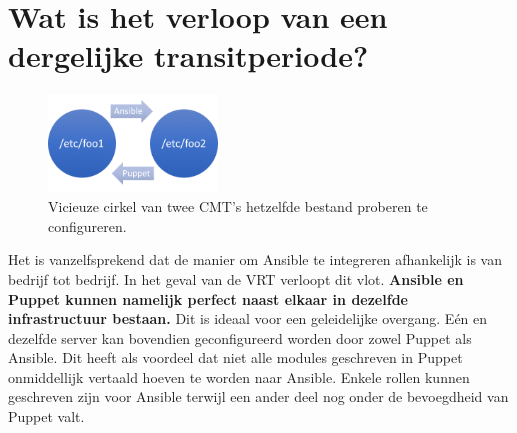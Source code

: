  
\section{Wat is het verloop van een dergelijke transitperiode?}
\label{sec:methodologie-verloop-transit}



\begin{figure}
\centering
\includegraphics[width=0.4\textwidth]{img/vicieuzecirkel.PNG}
\caption{\label{fig:vicieuzecirkel}Vicieuze cirkel van twee \gls{CMT}'s hetzelfde bestand proberen te configureren.}
\end{figure}

Het is vanzelfsprekend dat de manier om Ansible te integreren afhankelijk is van bedrijf tot bedrijf. In het geval van de VRT verloopt dit vlot. \textbf{Ansible en Puppet kunnen namelijk perfect naast elkaar in dezelfde infrastructuur bestaan.} Dit is ideaal voor een geleidelijke overgang. E\'en en dezelfde server kan bovendien geconfigureerd worden door zowel Puppet als Ansible. Dit heeft als voordeel dat niet alle modules geschreven in Puppet onmiddellijk vertaald hoeven te worden naar Ansible. Enkele rollen kunnen geschreven zijn voor Ansible terwijl een ander deel nog onder de bevoegdheid van Puppet valt.

